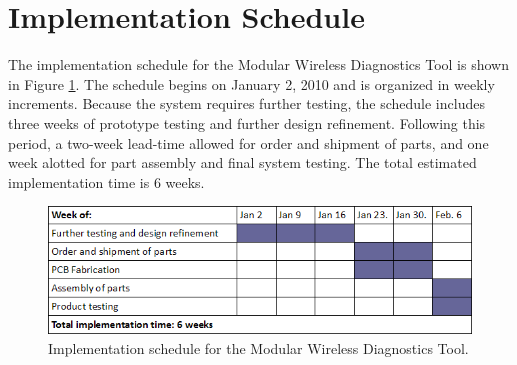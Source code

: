 \section{Implementation Schedule}
The implementation schedule for the Modular Wireless Diagnostics Tool is shown
in Figure \ref{fig:implement sched}. The schedule begins on January 2, 2010 and 
is organized in weekly increments. Because the system requires further testing,
the schedule includes three weeks of prototype testing and further design refinement.
Following this period, a two-week lead-time allowed for order and shipment of parts, 
and one week alotted for part assembly and final system testing. The total estimated
implementation time is 6 weeks.


\begin{figure}[bhp]
\begin{center}
\includegraphics[scale=0.55]{../drawings/implement_sched.png}
\end{center}
\caption[Implementation Schedule]{Implementation schedule for the Modular Wireless
Diagnostics Tool.}
\label{fig:implement sched}
\end{figure}
